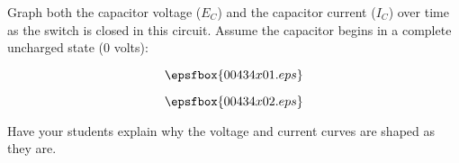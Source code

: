 

Graph both the capacitor voltage ($E_C$) and the capacitor current ($I_C$) over time as the switch is closed in this circuit.  Assume the capacitor begins in a complete uncharged state (0 volts):

$$\epsfbox{00434x01.eps}$$







$$\epsfbox{00434x02.eps}$$







Have your students explain why the voltage and current curves are shaped as they are.




